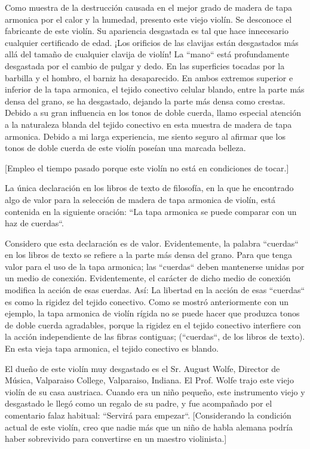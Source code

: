 \documentclass[12pt]{book}
\begin{document}
Como muestra de la destrucción causada en el mejor grado de madera de tapa armonica por el calor y la humedad, presento este viejo violín. Se desconoce el fabricante de este violín. Su apariencia desgastada es tal que hace innecesario cualquier certificado de edad. ¡Los orificios de las clavijas están desgastados más allá del tamaño de cualquier clavija de violín! La ``mano`` está profundamente desgastada por el cambio de pulgar y dedo. En las superficies tocadas por la barbilla y el hombro, el barniz ha desaparecido. En ambos extremos superior e inferior de la tapa armonica, el tejido conectivo celular blando, entre la parte más densa del grano, se ha desgastado, dejando la parte más densa como crestas. Debido a su gran influencia en los tonos de doble cuerda, llamo especial atención a la naturaleza blanda del tejido conectivo en esta muestra de madera de tapa armonica. Debido a mi larga experiencia, me siento seguro al afirmar que los tonos de doble cuerda de este violín poseían una marcada belleza.

[Empleo el tiempo pasado porque este violín no está en condiciones de tocar.]

La única declaración en los libros de texto de filosofía, en la que he encontrado algo de valor para la selección de madera de tapa armonica de violín, está contenida en la siguiente oración: ``La tapa armonica se puede comparar con un haz de cuerdas``.

Considero que esta declaración es de valor. Evidentemente, la palabra ``cuerdas`` en los libros de texto se refiere a la parte más densa del grano. Para que tenga valor para el uso de la tapa armonica; las ``cuerdas`` deben mantenerse unidas por un medio de conexión. Evidentemente, el carácter de dicho medio de conexión modifica la acción de esas cuerdas. Así: La libertad en la acción de esas ``cuerdas`` es como la rigidez del tejido conectivo. Como se mostró anteriormente con un ejemplo, la tapa armonica de violín rígida no se puede hacer que produzca tonos de doble cuerda agradables, porque la rigidez en el tejido conectivo interfiere con la acción independiente de las fibras contiguas; (``cuerdas``, de los libros de texto). En esta vieja tapa armonica, el tejido conectivo es blando.

El dueño de este violín muy desgastado es el Sr. August Wolfe, Director de Música, Valparaiso College, Valparaiso, Indiana. El Prof. Wolfe trajo este viejo violín de su casa austriaca. Cuando era un niño pequeño, este instrumento viejo y desgastado le llegó como un regalo de su padre, y fue acompañado por el comentario falaz habitual: ``Servirá para empezar``. [Considerando la condición actual de este violín, creo que nadie más que un niño de habla alemana podría haber sobrevivido para convertirse en un maestro violinista.]
\end{document}
